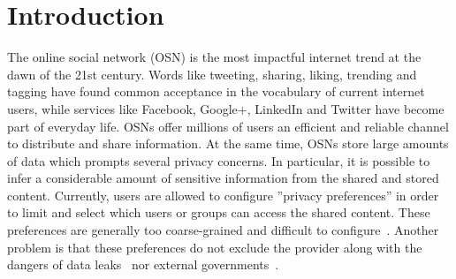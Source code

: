\chapter{Introduction}
\label{cha:intro}
The online social network (OSN) is the most impactful internet trend at the dawn of the 21st century. Words like tweeting, sharing, liking, trending and tagging have found common acceptance in the vocabulary of current internet users, while services like Facebook, Google+, LinkedIn and Twitter have become part of everyday life. OSNs offer millions of users an efficient and reliable channel to distribute and share information. At the same time, OSNs store large amounts of data which prompts several privacy concerns. In particular, it is possible to infer a considerable amount of sensitive information from the shared and stored content. Currently, users are allowed to configure ''privacy preferences'' in order to limit and select which users or groups can access the shared content. These preferences are generally too coarse-grained and difficult to configure~\cite{art:BonneauPS10}. Another problem is that these preferences do not exclude the provider along with the dangers of data leaks~\cite{art:Fischetti11} nor external governments~\cite{prism}.




